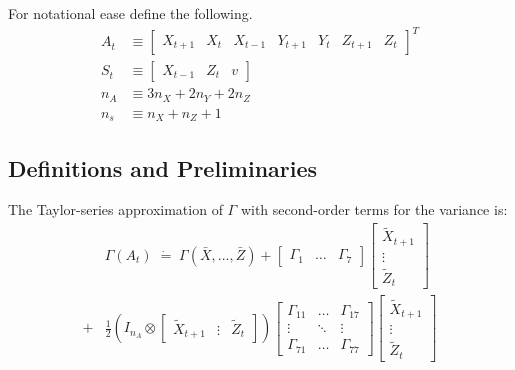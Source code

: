\documentclass[letterpaper,12pt]{article}
\theoremstyle{definition}
\begin{document}
\begin{spacing}{1.5}
	For notational ease define the following.
	\begin{align}
		A_t & \equiv \begin{bmatrix} X_{t+1} & X_t & X_{t-1} & Y_{t+1} & Y_t & Z_{t+1} & Z_t \end{bmatrix}^T \label{Perturb_Adef} \\
		S_t & \equiv \begin{bmatrix} X_{t-1} & Z_t & v\end{bmatrix} \label{Perturb_Sdef} \\
		n_A & \equiv 3n_X + 2n_Y + 2n_Z \\
		n_s & \equiv n_X + n_Z + 1
	\end{align}

	\subsection{Definitions and Preliminaries}
		The Taylor-series approximation of $\Gamma$ with second-order terms for the variance is:
		\begin{equation} \label{Perturb_quadtermsGam}
		\begin{split}
		& \Gamma(A_t) \;\dot =\; \Gamma(\bar X, ..., \bar Z) + \begin{bmatrix} \Gamma_1 & \dots & \Gamma_7 \end{bmatrix} \begin{bmatrix} \tilde X_{t+1} \\ \vdots \\ \tilde Z_t \end{bmatrix}  \\
		+ & \frac{1}{2} \left( I_{n_A} \otimes \begin{bmatrix} \tilde X_{t+1} & \vdots & \tilde Z_t \end{bmatrix} \right) \begin{bmatrix} \Gamma_{11} & \dots & \Gamma_{17} \\  \vdots & \ddots & \vdots \\ \Gamma_{71} & \dots & \Gamma_{77} \end{bmatrix} \begin{bmatrix} \tilde X_{t+1} \\ \vdots \\ \tilde Z_t \end{bmatrix}
		\end{split}
		\end{equation}


\end{spacing}
\end{document}
